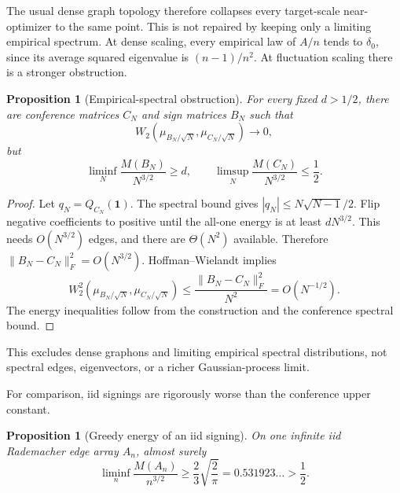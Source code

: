 \documentclass[11pt]{article}
\newtheorem{proposition}[theorem]{Proposition}
\begin{document}
The usual dense graph topology therefore collapses every target-scale
near-optimizer to the same point.  This is not repaired by keeping only a
limiting empirical spectrum.  At dense scaling, every empirical law of
\(A/n\) tends to \(\delta_0\), since its average squared eigenvalue is
\((n-1)/n^2\).  At fluctuation scaling there is a stronger obstruction.

\begin{proposition}[Empirical-spectral obstruction]
\label{prop:spectrum}
For every fixed \(d>1/2\), there are conference matrices \(C_N\) and sign
matrices \(B_N\) such that
\[
 W_2(\mu_{B_N/\sqrt N},\mu_{C_N/\sqrt N})\longrightarrow0,
\]
but
\[
 \liminf_N\frac{M(B_N)}{N^{3/2}}\ge d,
 \qquad
 \limsup_N\frac{M(C_N)}{N^{3/2}}\le\frac12.
\]
\end{proposition}

\begin{proof}
Let \(q_N=Q_{C_N}(\mathbf1)\).  The spectral bound gives
\(|q_N|\le N\sqrt{N-1}/2\).  Flip negative coefficients to positive until
the all-one energy is at least \(dN^{3/2}\).  This needs \(O(N^{3/2})\) edges,
and there are \(\Theta(N^2)\) available.  Therefore
\(\|B_N-C_N\|_F^2=O(N^{3/2})\).  Hoffman--Wielandt implies
\[
 W_2^2(\mu_{B_N/\sqrt N},\mu_{C_N/\sqrt N})
 \le\frac{\|B_N-C_N\|_F^2}{N^2}=O(N^{-1/2}).
\]
The energy inequalities follow from the construction and the conference
spectral bound.
\end{proof}

This excludes dense graphons and limiting empirical spectral distributions,
not spectral edges, eigenvectors, or a richer Gaussian-process limit.

For comparison, iid signings are rigorously worse than the conference upper
constant.

\begin{proposition}[Greedy energy of an iid signing]
On one infinite iid Rademacher edge array \(A_n\), almost surely
\[
 \liminf_n\frac{M(A_n)}{n^{3/2}}
 \ge\frac23\sqrt{\frac2\pi}=0.531923\ldots>\frac12.
\]
\end{proposition}
\end{document}
